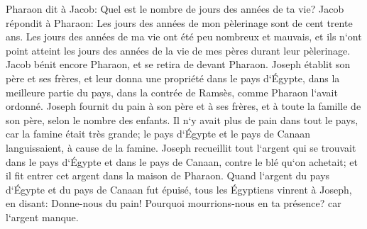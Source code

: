 \verse Pharaon dit à Jacob: Quel est le nombre de jours des années de ta vie? 
\verse Jacob répondit à Pharaon: Les jours des années de mon pèlerinage sont de cent trente ans. Les jours des années de ma vie ont été peu nombreux et mauvais, et ils n`ont point atteint les jours des années de la vie de mes pères durant leur pèlerinage. 
\verse Jacob bénit encore Pharaon, et se retira de devant Pharaon. 
\verse Joseph établit son père et ses frères, et leur donna une propriété dans le pays d`Égypte, dans la meilleure partie du pays, dans la contrée de Ramsès, comme Pharaon l`avait ordonné. 
\verse Joseph fournit du pain à son père et à ses frères, et à toute la famille de son père, selon le nombre des enfants. 
\verse Il n`y avait plus de pain dans tout le pays, car la famine était très grande; le pays d`Égypte et le pays de Canaan languissaient, à cause de la famine. 
\verse Joseph recueillit tout l`argent qui se trouvait dans le pays d`Égypte et dans le pays de Canaan, contre le blé qu`on achetait; et il fit entrer cet argent dans la maison de Pharaon. 
\verse Quand l`argent du pays d`Égypte et du pays de Canaan fut épuisé, tous les Égyptiens vinrent à Joseph, en disant: Donne-nous du pain! Pourquoi mourrions-nous en ta présence? car l`argent manque. 
